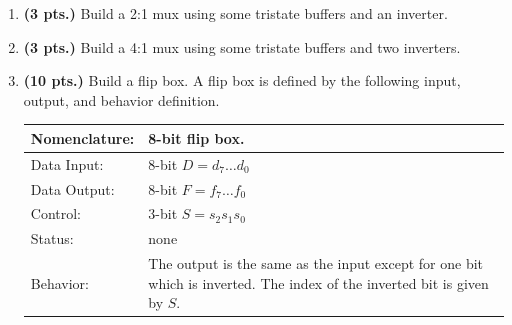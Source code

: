 \begin{enumerate}
\item{\bf (3 pts.)} Build a 2:1 mux using some tristate buffers and an inverter.                                                                                
\item{\bf (3 pts.)} Build a 4:1 mux using some tristate buffers and two inverters.
                                                                                
\begin{solution} {
\begin{figure}[ht]
\end{figure}
} \end{solution}
                                                                                
\item {\bf (10 pts.)}
\label{page:flipbox}
Build a flip box.  A flip box is defined by the following input,
output, and behavior definition.

\begin{tabular}{|l|p{3.5in}|} \hline
Nomenclature:  & 8-bit flip box.                    \\ \hline
Data Input:    & 8-bit $D=d_7 \ldots d_0$          \\ \hline
Data Output:   & 8-bit $F=f_7 \ldots f_0$          \\ \hline
Control:       & 3-bit $S=s_2 s_1 s_0$            \\ \hline
Status:        & none                                   \\ \hline
Behavior:      & The output is the same as the input except for
		one bit which is inverted.  The index of the inverted
		bit is given by $S$. \\ \hline
\end{tabular}


\end{enumerate}
